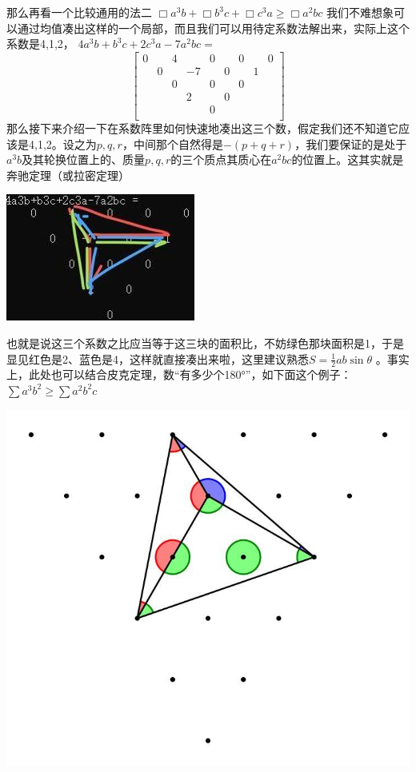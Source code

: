 \documentclass[UTF8]{ctexart}
\begin{document}
那么再看一个比较通用的法二
$ \Box a^{3} b+\Box b^{3} c+\Box c^{3} a \geq \Box a^{2} b c $
我们不难想象可以通过均值凑出这样的一个局部，而且我们可以用待定系数法解出来，实际上这个系数是4,1,2，
$ 4a^{3}b+b^{3}c+2c^{3}a-7a^{2}bc= $\\
\renewcommand*{\arraystretch}{1.732}\[\left[\begin{matrix}
	0& &4& &0& &0& &0\\
	& 0& &-7& &0& &1&\\
	& &0& &0& &0& &\\
	& & &2& &0& & &\\
	& & & &0& & & &\\
\end{matrix}\right]\]
那么接下来介绍一下在系数阵里如何快速地凑出这三个数，假定我们还不知道它应该是4,1,2。设之为$ p,q,r $，中间那个自然得是$ -(p+q+r) $，我们要保证的是处于$ a^{3}b $及其轮换位置上的、质量$ p,q,r $的三个质点其质心在$ a^{2}bc $的位置上。这其实就是奔驰定理（或拉密定理）

\begin{center}
	\includegraphics[width=0.4\linewidth]{130}
\end{center}

也就是说这三个系数之比应当等于这三块的面积比，不妨绿色那块面积是1，于是显见红色是2、蓝色是4，这样就直接凑出来啦，这里建议熟悉$ S=\displaystyle \frac{1}{2}ab  \sin \theta $
。事实上，此处也可以结合皮克定理，数“有多少个180°”，如下面这个例子：\\
$ \displaystyle  \sum a^{3} b^{2} \geq \displaystyle  \sum a^{2} b^{2} c $

\begin{center}
	\includegraphics[width=0.4\linewidth]{140}
\end{center}
\end{document}
